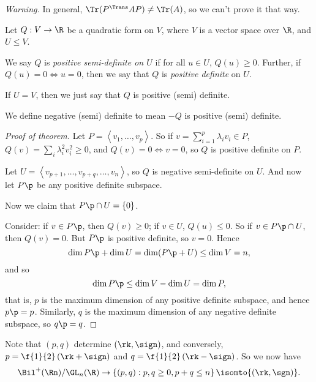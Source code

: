 \emph{Warning.} In general, $\Tr(P^\Trans AP) \neq \Tr(A)$, so we can't prove it that way.

	\vspace{3pt}

\begin{definition}
	Let $Q:V\to\R$ be a quadratic form on $V$,  where $V$ is a vector space over $\R$, and $U\leq V$.

	We say $Q$ is \emph{positive semi-definite on $U$} if for all $u\in U$, $Q(u)\geq 0$. Further, if $Q(u)=0 \iff u=0$, then we say that $Q$ is \emph{positive definite} on $U$. %
	
	If $U=V$, then we just say that $Q$ is positive (semi) definite.

	We define negative (semi) definite to mean $-Q$ is positive (semi) definite. %
\end{definition}

	\pagebreak

\begin{proof}
	[Proof of theorem] Let $P=\left\langle v_1,\ldots,v_p \right\rangle$. So if $v=\sum_{i=1}^p \lambda_i v_i \in P$, $Q(v)=\sum_i \lambda_i^2 v_i^2 \geq 0$, and $Q(v)=0 \iff v=0$, so $Q$ is positive definite on $P$. %
	
	Let $U=\left\langle v_{p+1},\ldots,v_{p+q},\ldots,v_n \right\rangle$, so $Q$ is negative semi-definite on $U$. And now let $P\p$ be any positive definite subspace. %
	
	Now we claim that $P\p\cap U=\{0\}$.
	
	Consider: if $v\in P\p$, then $Q(v)\geq 0$; if $v\in U$, $Q(u)\leq 0$. So if $v\in P\p\cap U$, then $Q(v)=0$. But $P\p$ is positive definite, so $v=0$. Hence %
	\begin{equation*}
		\dim P\p+\dim U = \dim(P\p+U) \leq \dim V = n,
	\end{equation*}
	and so
	\begin{equation*}
		\dim P\p \leq  \dim V - \dim U = \dim P,
	\end{equation*}
	that is, $p$ is the maximum dimension of any positive definite subspace, and hence $p\p=p$. Similarly, $q$ is the maximum dimension of any negative definite subspace, so $q\p=q$. %
\end{proof}

Note that $(p,q)$ determine $(\rk,\sign)$, and conversely, $p=\f{1}{2}\left( \rk+\sign \right)$ and $q=\f{1}{2}\left( \rk-\sign \right)$. So we now have
\begin{equation*}
	\Bil^+(\Rn)/\GL_n(\R)
	\to \left\{(p,q) : p,q\geq 0, p+q\leq n \right\} \isomto \{(\rk,\sgn)\}.
\end{equation*}

